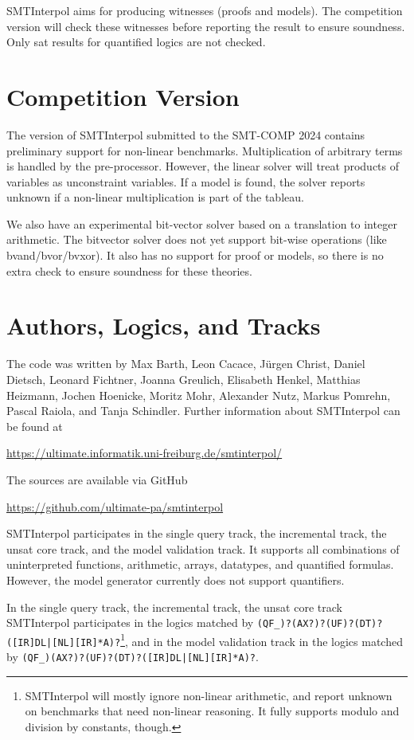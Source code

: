 \documentclass[a4paper]{easychair}
\newcommand\SI{SMTInterpol\xspace}
\begin{document}
\SI aims for producing witnesses (proofs and models).  The competition version will check these witnesses before reporting the result to ensure soundness.  Only sat results for quantified logics are not checked.

\section*{Competition Version}
The version of \SI submitted to the SMT-COMP 2024 contains
preliminary support for non-linear benchmarks.  Multiplication of arbitrary terms is handled by the pre-processor.  However, the linear solver will treat products of variables as unconstraint variables.  If a model is found, the solver reports unknown if a non-linear multiplication is part of the tableau.

We also have an experimental bit-vector solver based on a translation to integer arithmetic.  The bitvector solver does not yet support bit-wise operations (like bvand/bvor/bvxor). It also has no support for proof or models, so there is no extra check to ensure soundness for these theories.

\section*{Authors, Logics, and Tracks}
The code was written by Max Barth, Leon Cacace, J{\"u}rgen Christ, Daniel Dietsch, Leonard Fichtner, Joanna Greulich, Elisabeth Henkel, Matthias Heizmann, Jochen Hoenicke, Moritz Mohr, Alexander Nutz, Markus Pomrehn, Pascal Raiola, and Tanja Schindler.
Further information about \SI can be found at
\begin{center}
  \url{https://ultimate.informatik.uni-freiburg.de/smtinterpol/}
\end{center}
The sources are available via GitHub
\begin{center}
  \url{https://github.com/ultimate-pa/smtinterpol}
\end{center}

\SI participates in the single query track, the incremental track, the unsat core track, and the model validation track.
It supports all combinations of uninterpreted functions, arithmetic, arrays, datatypes, and quantified formulas.
However, the model generator currently does not support quantifiers.

In the single query track, the incremental track, the unsat core track \SI participates in the logics matched by
\verb!(QF_)?(AX?)?(UF)?(DT)?([IR]DL|[NL][IR]*A)?!\footnote{\SI will mostly ignore non-linear arithmetic, and report unknown on benchmarks that need non-linear reasoning.  It fully supports modulo and division by constants, though.},
and in the model validation track in the logics matched by
\verb!(QF_)(AX?)?(UF)?(DT)?([IR]DL|[NL][IR]*A)?!.



\end{document}
